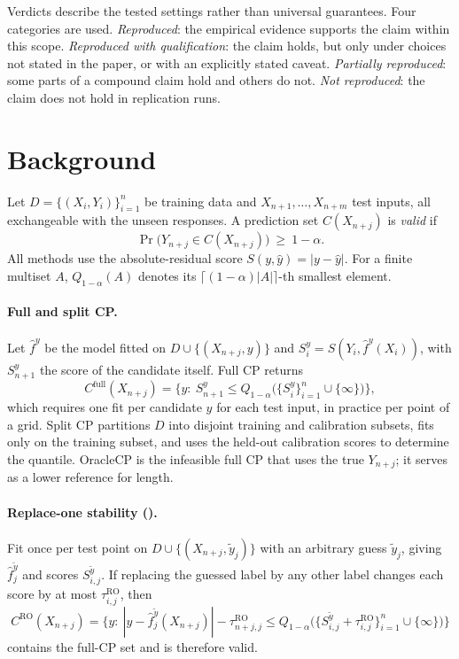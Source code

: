 Verdicts describe the tested settings rather than universal guarantees. Four categories are used. \emph{Reproduced}: the empirical evidence supports the claim within this scope. \emph{Reproduced with qualification}:
the claim holds, but only under choices not stated in the paper, or with an explicitly stated caveat. \emph{Partially
reproduced}: some parts of a compound claim hold and others do not. \emph{Not reproduced}: the claim does not hold in
replication runs.

\section{Background}
\label{sec:background}

Let $D=\{(X_i,Y_i)\}_{i=1}^n$ be training data and $X_{n+1},\dots,X_{n+m}$ test inputs, all exchangeable with the
unseen responses. A prediction set $C(X_{n+j})$ is \emph{valid} if
\begin{equation}
  \Pr\big(Y_{n+j}\in C(X_{n+j})\big)\ \ge\ 1-\alpha .
  \label{eq:validity}
\end{equation}
All methods use the absolute-residual score $S(y,\hat y)=|y-\hat y|$. For a finite multiset $A$,
$Q_{1-\alpha}(A)$ denotes its $\lceil(1-\alpha)|A|\rceil$-th smallest element.

\paragraph{Full and split CP.} Let $\hat f^{y}$ be the model fitted on $D\cup\{(X_{n+j},y)\}$ and
$S_i^y=S(Y_i,\hat f^y(X_i))$, with $S^y_{n+1}$ the score of the candidate itself. Full CP returns
\begin{equation}
  C^{\mathrm{full}}(X_{n+j})=\Big\{y:\ S^y_{n+1}\le Q_{1-\alpha}\big(\{S_i^y\}_{i=1}^n\cup\{\infty\}\big)\Big\},
  \label{eq:fullcp}
\end{equation}
which requires one fit per candidate $y$ for each test input, in practice per point of a grid. Split CP partitions $D$ into disjoint training and calibration subsets, fits only on the training subset, and uses the held-out calibration scores to determine the quantile. OracleCP is the infeasible full CP that
uses the true $Y_{n+j}$; it serves as a lower reference for length.

\paragraph{Replace-one stability (\RO).} Fit once per test point on $D\cup\{(X_{n+j},\tilde y_j)\}$ with an
arbitrary guess $\tilde y_j$, giving $\hat f_j^{\tilde y}$ and scores $S_{i,j}^{\tilde y}$. If replacing the guessed
label by any other label changes each score by at most $\tau^{\mathrm{RO}}_{i,j}$, then
\begin{equation}
  C^{\mathrm{RO}}(X_{n+j})=\Big\{y:\ |y-\hat f_j^{\tilde y}(X_{n+j})|-\tau^{\mathrm{RO}}_{n+j,j}\le
  Q_{1-\alpha}\big(\{S^{\tilde y}_{i,j}+\tau^{\mathrm{RO}}_{i,j}\}_{i=1}^n\cup\{\infty\}\big)\Big\}
  \label{eq:ro}
\end{equation}
contains the full-CP set and is therefore valid\supercite{ndiaye2022stable}.

